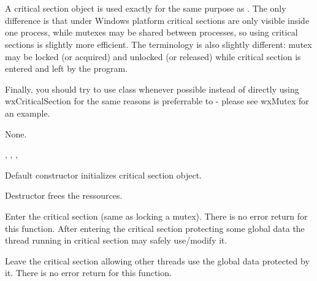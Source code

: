 \section{}\label{wxcriticalsection}

A critical section object is used exactly for the same purpose as 
. The only difference is that under Windows platform
critical sections are only visible inside one process, while mutexes may be
shared between processes, so using critical sections is slightly more
efficient. The terminology is also slightly different: mutex may be locked (or
acquired) and unlocked (or released) while critical section is entered and left
by the program.

Finally, you should try to use 
 class whenever
possible instead of directly using wxCriticalSection for the same reasons 
 is preferrable to 
 - please see wxMutex for an example.


None.


, , 
, 


\label{wxcriticalsectionctor}


Default constructor initializes critical section object.

\label{wxcriticalsectiondtor}


Destructor frees the ressources.

\label{wxcriticalsectionenter}


Enter the critical section (same as locking a mutex). There is no error return
for this function. After entering the critical section protecting some global
data the thread running in critical section may safely use/modify it.

\label{wxcriticalsectionleave}


Leave the critical section allowing other threads use the global data protected
by it. There is no error return for this function.

